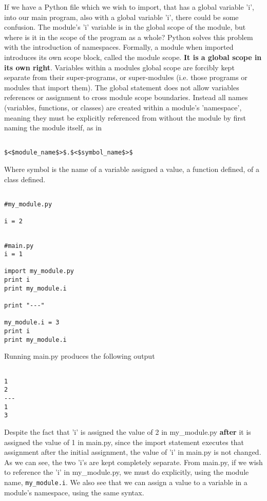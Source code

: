 If we have a Python file which we wish to import, that has a global   variable 'i', into our main program, also with a global variable 'i',   there could be some confusion. The module's 'i' variable is in the   global scope of the module, but where is it in the scope of the program   as a whole? Python solves this problem with the introduction of   namespaces. Formally, a module when imported introduces its own scope   block, called the module scope. \textbf{It is a global scope in its own   right}.  Variables within a modules global scope are forcibly   kept separate from their super-programs, or super-modules (i.e. those   programs or modules that import them). The global statement does not   allow variables references or assignment to cross module scope   boundaries. Instead all names (variables, functions, or classes) are   created within a module's 'namespace', meaning they must be explicitly   referenced from without the module by first naming the module itself,   as in
\begin{lstlisting}

$<$module_name$>$.$<$symbol_name$>$
\end{lstlisting}

Where symbol is the name of a variable assigned a value, a function   defined, of a class defined.
\begin{lstlisting}

#my_module.py

i = 2
\end{lstlisting}
\begin{lstlisting}

#main.py
i = 1

import my_module.py
print i
print my_module.i

print "---"

my_module.i = 3
print i
print my_module.i
\end{lstlisting}

Running main.py produces the following output
\begin{lstlisting}

1
2
---
1
3
\end{lstlisting}

Despite the fact that 'i' is assigned the value of 2 in my\_module.py   \textbf{after} it is assigned the value of 1 in main.py, since   the import statement executes that assignment after the initial   assignment, the value of 'i' in main.py is not changed. As we can see,   the two 'i's are kept completely separate. From main.py, if we wish to   reference the 'i' in my\_module.py, we must do explicitly, using the   module name, 
\texttt{my\_module.i}. We also see that we can assign a   value to a variable in a module's namespace, using the same syntax.

